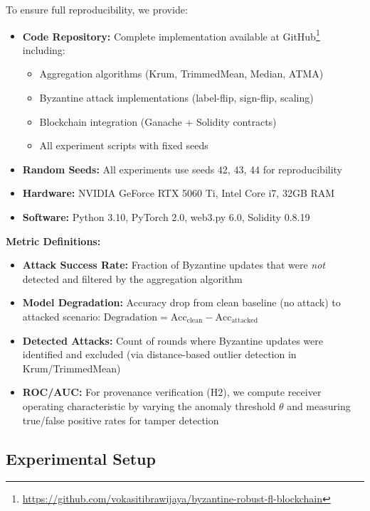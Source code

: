 \documentclass[12pt,a4paper,onecolumn]{article}
\begin{document}
To ensure full reproducibility, we provide:
\begin{itemize}
    \item \textbf{Code Repository:} Complete implementation available at GitHub\footnote{\url{https://github.com/vokasitibrawijaya/byzantine-robust-fl-blockchain}} including:
    \begin{itemize}
        \item Aggregation algorithms (Krum, TrimmedMean, Median, ATMA)
        \item Byzantine attack implementations (label-flip, sign-flip, scaling)
        \item Blockchain integration (Ganache + Solidity contracts)
        \item All experiment scripts with fixed seeds
    \end{itemize}
    \item \textbf{Random Seeds:} All experiments use seeds 42, 43, 44 for reproducibility
    \item \textbf{Hardware:} NVIDIA GeForce RTX 5060 Ti, Intel Core i7, 32GB RAM
    \item \textbf{Software:} Python 3.10, PyTorch 2.0, web3.py 6.0, Solidity 0.8.19
\end{itemize}

\textbf{Metric Definitions:}
\begin{itemize}
    \item \textbf{Attack Success Rate:} Fraction of Byzantine updates that were \emph{not} detected and filtered by the aggregation algorithm
    \item \textbf{Model Degradation:} Accuracy drop from clean baseline (no attack) to attacked scenario: $\text{Degradation} = \text{Acc}_{\text{clean}} - \text{Acc}_{\text{attacked}}$
    \item \textbf{Detected Attacks:} Count of rounds where Byzantine updates were identified and excluded (via distance-based outlier detection in Krum/TrimmedMean)
    \item \textbf{ROC/AUC:} For provenance verification (H2), we compute receiver operating characteristic by varying the anomaly threshold $\theta$ and measuring true/false positive rates for tamper detection
\end{itemize}

\subsection{Experimental Setup}
\end{document}
